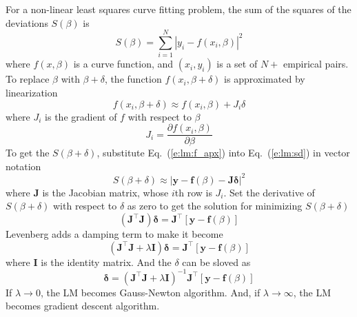 \documentclass{turgon}
\begin{document}
For a non-linear least squares curve fitting problem, the sum of the squares of the deviations $S(\beta)$ is
\begin{equation}
    \label{e:lm:sd}
    S(\beta) = \sum_{i=1}^N \left| y_i - f(x_i, \beta) \right|^2
\end{equation}
where $f(x, \beta)$ is a curve function, and $(x_i, y_i)$ is a set of $N+$ empirical pairs. To replace $\beta$ with
$\beta + \delta$, the function $f(x_i, \beta + \delta)$ is approximated by linearization
\begin{equation}
    f(x_i, \beta + \delta) \approx f(x_i, \beta) + J_i \delta
    \label{e:lm:f_apx}
\end{equation}
where $J_i$ is the gradient of $f$ with respect to $\beta$
\begin{equation*}
    J_i = \frac{\partial f(x_i, \beta)}{\partial \beta}
\end{equation*}
To get the $S(\beta + \delta)$, substitute Eq.~(\ref{e:lm:f_apx}) into Eq.~(\ref{e:lm:sd}) in vector notation
\begin{equation*}
    S(\beta + \delta) \approx \left| \mathbf{y} - \mathbf{f}(\beta) - \mathbf{J} \mathbf{\delta} \right|^2
\end{equation*}
where $\mathbf{J}$ is the Jacobian matrix, whose $i$th row is $J_i$. Set the derivative of $S(\beta + \delta)$ with
respect to $\delta$ as zero to get the solution for minimizing $S(\beta + \delta)$
\begin{equation*}
    \left( \mathbf{J}^\top \mathbf{J} \right) \mathbf{\delta} = \mathbf{J}^\top \left[ \mathbf{y} - \mathbf{f}(\beta) \right]
\end{equation*}
Levenberg adds a damping term to make it become
\begin{equation*}
    \left( \mathbf{J}^\top \mathbf{J} + \lambda \mathbf{I} \right) \mathbf{\delta} =
    \mathbf{J}^\top \left[ \mathbf{y} - \mathbf{f}(\beta) \right]
\end{equation*}
where $\mathbf{I}$ is the identity matrix. And the $\delta$ can be sloved as
\begin{equation}
    \mathbf{\delta} = \left( \mathbf{J}^\top \mathbf{J} + \lambda \mathbf{I} \right)^{-1}
    \mathbf{J}^\top \left[ \mathbf{y} - \mathbf{f}(\beta) \right]
    \label{e:lm:sol}
\end{equation}
If $\lambda \rightarrow 0$, the LM becomes Gauss-Newton algorithm. And, if $\lambda \rightarrow \infty$, the LM becomes
gradient descent algorithm.
\end{document}
